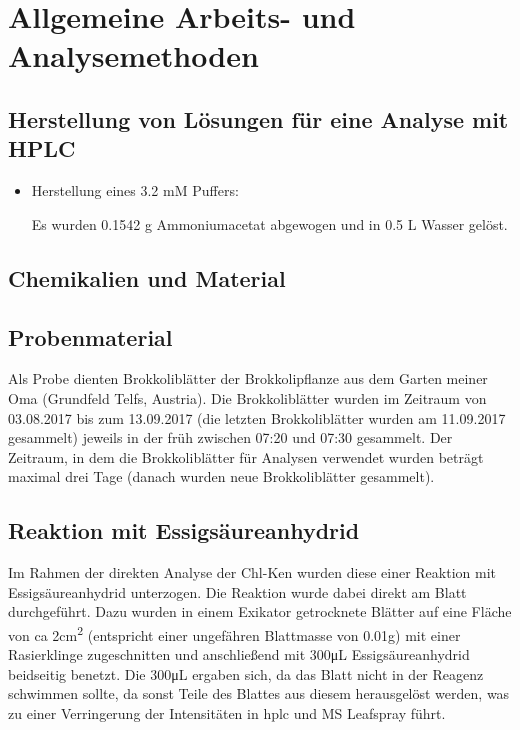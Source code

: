 \chapter{Allgemeine Arbeits- und Analysemethoden}

\section{Herstellung von Lösungen für eine Analyse mit HPLC}

\begin{itemize}
\item Herstellung eines 3.2 mM  Puffers:

Es wurden 0.1542 g Ammoniumacetat abgewogen und in 0.5 L Wasser gelöst.

\end{itemize}

\section{Chemikalien und Material}

\section{Probenmaterial}

Als Probe dienten Brokkoliblätter der Brokkolipflanze aus dem Garten meiner Oma (Grundfeld Telfs, Austria). Die Brokkoliblätter wurden im Zeitraum von 03.08.2017 bis zum 13.09.2017 (die letzten Brokkoliblätter wurden am 11.09.2017 gesammelt) jeweils in der früh zwischen 07:20 und 07:30 gesammelt. Der Zeitraum, in dem die Brokkoliblätter für Analysen verwendet wurden beträgt maximal drei Tage (danach wurden neue Brokkoliblätter gesammelt). \\

\section{Reaktion mit Essigsäureanhydrid} \label{sec:ReaktionEssig}

Im Rahmen der direkten Analyse der \gls{Chl-K}en wurden diese einer Reaktion mit Essigsäureanhydrid unterzogen. Die Reaktion wurde dabei direkt am Blatt durchgeführt. Dazu wurden in einem Exikator getrocknete Blätter auf eine Fläche von \gls{ca} 2cm\textsuperscript{2} (entspricht einer ungefähren Blattmasse von 0.01g) mit einer Rasierklinge zugeschnitten und anschließend mit 300\si{\uL} Essigsäureanhydrid beidseitig benetzt. Die 300\si{\uL} ergaben sich, da das Blatt nicht in der Reagenz schwimmen sollte, da sonst Teile des Blattes aus diesem herausgelöst werden, was zu einer Verringerung der Intensitäten in \gls{hplc} und MS Leafspray führt. 

